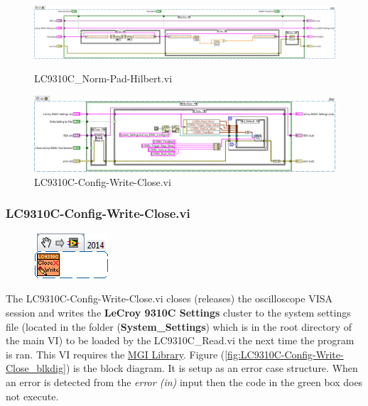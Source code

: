 \documentclass[11pt,a4paper,oldfontcommands]{memoir}
\begin{document}
\begin{figure}
	\includegraphics[width=\textheight,keepaspectratio]{LC931C_norm-pad-hilbert_blockdiagram_01}
	\caption{LC9310C\_Norm-Pad-Hilbert.vi}
	\label{fig:LC9310C_norm-pad-hilber_blkdig}
	\vspace{2cm}
	\includegraphics[width=\textheight,keepaspectratio]{LC931C-Config-Write-Close_blockdiagram_01}
	\caption{LC9310C-Config-Write-Close.vi}
	\label{fig:LC9310C-Config-Write-Closet_blkdig}
\end{figure}

\subsubsection{LC9310C-Config-Write-Close.vi} \label{LC9310C_cwc}
\noindent\hrulefill

\begin{figure}[H]
	\includegraphics[scale=0.625]{LC931C-Config-Write-Close_main_01}
	\label{fig:LC9310C-Config-Write-Close_main_01}
\end{figure}

The LC9310C-Config-Write-Close.vi closes (releases) the oscilloscope VISA session and writes the \textbf{LeCroy 9310C Settings} cluster to the system settings file (located in the folder (\textbf{System\_Settings}) which is in the root directory of the main VI) to be loaded by the LC9310C\_Read.vi the next time the program is ran. This VI requires the \href{http://sine.ni.com/nips/cds/view/p/lang/en/nid/209753}{MGI Library}. Figure (\ref{fig:LC9310C-Config-Write-Close_blkdig}) is the block diagram.  It is setup as an error case structure. When an error is detected from the \textit{error (in)} input then the code in the green box does not execute.
\end{document}
